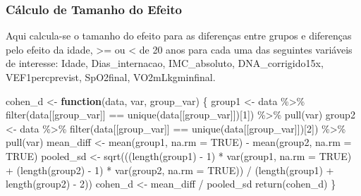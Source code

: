 \documentclass[
]{article}
\newenvironment{Shaded}{\begin{snugshade}}{\end{snugshade}}
\newcommand{\AttributeTok}[1]{\textcolor[rgb]{0.77,0.63,0.00}{#1}}
\newcommand{\ConstantTok}[1]{\textcolor[rgb]{0.00,0.00,0.00}{#1}}
\newcommand{\ControlFlowTok}[1]{\textcolor[rgb]{0.13,0.29,0.53}{\textbf{#1}}}
\newcommand{\DecValTok}[1]{\textcolor[rgb]{0.00,0.00,0.81}{#1}}
\newcommand{\FunctionTok}[1]{\textcolor[rgb]{0.00,0.00,0.00}{#1}}
\newcommand{\NormalTok}[1]{#1}
\newcommand{\OtherTok}[1]{\textcolor[rgb]{0.56,0.35,0.01}{#1}}
\newcommand{\SpecialCharTok}[1]{\textcolor[rgb]{0.00,0.00,0.00}{#1}}
\begin{document}
\hypertarget{cuxe1lculo-de-tamanho-do-efeito}{%
\subsubsection{Cálculo de Tamanho do
Efeito}\label{cuxe1lculo-de-tamanho-do-efeito}}

Aqui calcula-se o tamanho do efeito para as diferenças entre grupos e
diferenças pelo efeito da idade, \textgreater= ou \textless{} de 20 anos
para cada uma das seguintes variáveis de interesse: Idade,
Dias\_internacao, IMC\_absoluto, DNA\_corrigido15x, VEF1percprevist,
SpO2final, VO2mLkgminfinal.

\begin{Shaded}
\begin{Highlighting}[]
\NormalTok{cohen\_d }\OtherTok{\textless{}{-}} \ControlFlowTok{function}\NormalTok{(data, var, group\_var) \{}
\NormalTok{    group1 }\OtherTok{\textless{}{-}}\NormalTok{ data }\SpecialCharTok{\%\textgreater{}\%}
        \FunctionTok{filter}\NormalTok{(data[[group\_var]] }\SpecialCharTok{==} \FunctionTok{unique}\NormalTok{(data[[group\_var]])[}\DecValTok{1}\NormalTok{]) }\SpecialCharTok{\%\textgreater{}\%}
        \FunctionTok{pull}\NormalTok{(var)}
\NormalTok{    group2 }\OtherTok{\textless{}{-}}\NormalTok{ data }\SpecialCharTok{\%\textgreater{}\%}
        \FunctionTok{filter}\NormalTok{(data[[group\_var]] }\SpecialCharTok{==} \FunctionTok{unique}\NormalTok{(data[[group\_var]])[}\DecValTok{2}\NormalTok{]) }\SpecialCharTok{\%\textgreater{}\%}
        \FunctionTok{pull}\NormalTok{(var)}
\NormalTok{    mean\_diff }\OtherTok{\textless{}{-}} \FunctionTok{mean}\NormalTok{(group1, }\AttributeTok{na.rm =} \ConstantTok{TRUE}\NormalTok{) }\SpecialCharTok{{-}} \FunctionTok{mean}\NormalTok{(group2, }\AttributeTok{na.rm =} \ConstantTok{TRUE}\NormalTok{)}
\NormalTok{    pooled\_sd }\OtherTok{\textless{}{-}} \FunctionTok{sqrt}\NormalTok{(((}\FunctionTok{length}\NormalTok{(group1) }\SpecialCharTok{{-}} \DecValTok{1}\NormalTok{) }\SpecialCharTok{*} \FunctionTok{var}\NormalTok{(group1, }\AttributeTok{na.rm =} \ConstantTok{TRUE}\NormalTok{) }\SpecialCharTok{+}\NormalTok{ (}\FunctionTok{length}\NormalTok{(group2) }\SpecialCharTok{{-}} \DecValTok{1}\NormalTok{) }\SpecialCharTok{*} \FunctionTok{var}\NormalTok{(group2, }\AttributeTok{na.rm =} \ConstantTok{TRUE}\NormalTok{)) }\SpecialCharTok{/}\NormalTok{ (}\FunctionTok{length}\NormalTok{(group1) }\SpecialCharTok{+} \FunctionTok{length}\NormalTok{(group2) }\SpecialCharTok{{-}} \DecValTok{2}\NormalTok{))}
\NormalTok{    cohen\_d }\OtherTok{\textless{}{-}}\NormalTok{ mean\_diff }\SpecialCharTok{/}\NormalTok{ pooled\_sd}
    \FunctionTok{return}\NormalTok{(cohen\_d)}
\NormalTok{\}}


\end{Highlighting}
\end{Shaded}
\end{document}

